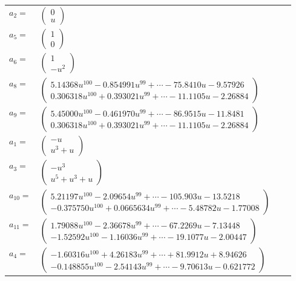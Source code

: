\documentclass[1p]{elsarticle_modified}
\theoremstyle{definition}
\begin{document}
\begin{tabular}{m{7pt} m{180pt} m{7pt} m{180pt} }
\flushright $a_{2}=$&$\begin{pmatrix}0\\u\end{pmatrix}$ \\
\flushright $a_{5}=$&$\begin{pmatrix}1\\0\end{pmatrix}$ \\
\flushright $a_{6}=$&$\begin{pmatrix}1\\- u^2\end{pmatrix}$ \\
\flushright $a_{8}=$&$\begin{pmatrix}5.14368 u^{100}-0.854991 u^{99}+\cdots-75.8410 u-9.57926\\0.306318 u^{100}+0.393021 u^{99}+\cdots-11.1105 u-2.26884\end{pmatrix}$ \\
\flushright $a_{9}=$&$\begin{pmatrix}5.45000 u^{100}-0.461970 u^{99}+\cdots-86.9515 u-11.8481\\0.306318 u^{100}+0.393021 u^{99}+\cdots-11.1105 u-2.26884\end{pmatrix}$ \\
\flushright $a_{1}=$&$\begin{pmatrix}- u\\u^3+u\end{pmatrix}$ \\
\flushright $a_{3}=$&$\begin{pmatrix}- u^3\\u^5+u^3+u\end{pmatrix}$ \\
\flushright $a_{10}=$&$\begin{pmatrix}5.21197 u^{100}-2.09654 u^{99}+\cdots-105.903 u-13.5218\\-0.375750 u^{100}+0.0665634 u^{99}+\cdots-5.48782 u-1.77008\end{pmatrix}$ \\
\flushright $a_{11}=$&$\begin{pmatrix}1.79088 u^{100}-2.36678 u^{99}+\cdots-67.2269 u-7.13448\\-1.52592 u^{100}-1.16036 u^{99}+\cdots-19.1077 u-2.00447\end{pmatrix}$ \\
\flushright $a_{4}=$&$\begin{pmatrix}-1.60316 u^{100}+4.26183 u^{99}+\cdots+81.9912 u+8.94626\\-0.148855 u^{100}-2.54143 u^{99}+\cdots-9.70613 u-0.621772\end{pmatrix}$ \\

\end{tabular}
\end{document}
